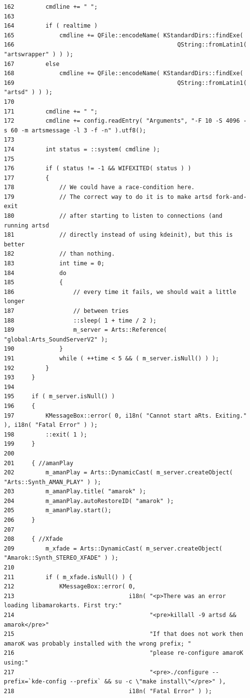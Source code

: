 \begin{verbatim}
162         cmdline += " ";
163 
164         if ( realtime )
165             cmdline += QFile::encodeName( KStandardDirs::findExe(
166                                               QString::fromLatin1( "artswrapper" ) ) );
167         else
168             cmdline += QFile::encodeName( KStandardDirs::findExe(
169                                               QString::fromLatin1( "artsd" ) ) );
170 
171         cmdline += " ";
172         cmdline += config.readEntry( "Arguments", "-F 10 -S 4096 -s 60 -m artsmessage -l 3 -f -n" ).utf8();
173 
174         int status = ::system( cmdline );
175 
176         if ( status != -1 && WIFEXITED( status ) )
177         {
178             // We could have a race-condition here.
179             // The correct way to do it is to make artsd fork-and-exit
180             // after starting to listen to connections (and running artsd
181             // directly instead of using kdeinit), but this is better
182             // than nothing.
183             int time = 0;
184             do
185             {
186                 // every time it fails, we should wait a little longer
187                 // between tries
188                 ::sleep( 1 + time / 2 );
189                 m_server = Arts::Reference( "global:Arts_SoundServerV2" );
190             }
191             while ( ++time < 5 && ( m_server.isNull() ) );
192         }
193     }
194 
195     if ( m_server.isNull() )
196     {
197         KMessageBox::error( 0, i18n( "Cannot start aRts. Exiting." ), i18n( "Fatal Error" ) );
198         ::exit( 1 );
199     }
200 
201     { //amanPlay
202         m_amanPlay = Arts::DynamicCast( m_server.createObject( "Arts::Synth_AMAN_PLAY" ) );
203         m_amanPlay.title( "amarok" );
204         m_amanPlay.autoRestoreID( "amarok" );
205         m_amanPlay.start();
206     }
207 
208     { //Xfade
209         m_xfade = Arts::DynamicCast( m_server.createObject( "Amarok::Synth_STEREO_XFADE" ) );
210 
211         if ( m_xfade.isNull() ) {
212             KMessageBox::error( 0,
213                                 i18n( "<p>There was an error loading libamarokarts. First try:"
214                                       "<pre>killall -9 artsd && amarok</pre>"
215                                       "If that does not work then amaroK was probably installed with the wrong prefix; "
216                                       "please re-configure amaroK using:"
217                                       "<pre>./configure --prefix=`kde-config --prefix` && su -c \"make install\"</pre>" ),
218                                 i18n( "Fatal Error" ) );

\end{verbatim}
